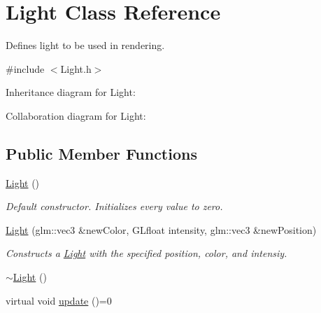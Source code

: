 \hypertarget{class_light}{\section{Light Class Reference}
\label{class_light}
}


Defines light to be used in rendering.  




{\ttfamily \#include $<$Light.\-h$>$}



Inheritance diagram for Light\-:


Collaboration diagram for Light\-:
\subsection*{Public Member Functions}
\begin{DoxyCompactItemize}
\item 
\hypertarget{class_light_aeb5df09a25a32f19fdffa761268ba24f}{\hyperlink{class_light_aeb5df09a25a32f19fdffa761268ba24f}{Light} ()}\label{class_light_aeb5df09a25a32f19fdffa761268ba24f}

\begin{DoxyCompactList}\small\item\em Default constructor. Initializes every value to zero. \end{DoxyCompactList}\item 
\hyperlink{class_light_a4159383707acc34304efac2d275dd287}{Light} (glm\-::vec3 \&new\-Color, G\-Lfloat intensity, glm\-::vec3 \&new\-Position)
\begin{DoxyCompactList}\small\item\em Constructs a \hyperlink{class_light}{Light} with the specified position, color, and intensiy. \end{DoxyCompactList}\item 
\hyperlink{class_light_ad0e59fad13bb6cfadc25b2c477e9ddc7}{$\sim$\-Light} ()
\item 
\hypertarget{class_light_a9552078368990d2108729f55072091ec}{virtual void \hyperlink{class_light_a9552078368990d2108729f55072091ec}{update} ()=0}\label{class_light_a9552078368990d2108729f55072091ec}


\end{DoxyCompactItemize}
